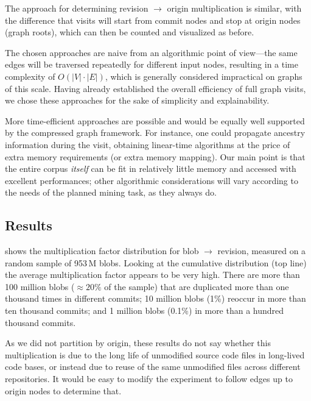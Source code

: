 The approach for determining revision $\to$ origin multiplication is similar,
with the difference that visits will start from commit nodes and stop at origin
nodes (graph roots), which can then be counted and visualized as before.

The chosen approaches are naive from an algorithmic point of view---the same
edges will be traversed repeatedly for different input nodes,
resulting in a time complexity of $O(|V|\cdot |E|)$, which is generally
considered impractical on graphs of this scale.  Having already established the
overall efficiency of full graph visits, we chose these approaches for the sake
of simplicity and explainability.

More time-efficient approaches are possible and would be equally well supported
by the compressed graph framework. For instance, one could propagate ancestry
information during the visit, obtaining linear-time algorithms at the price of
extra memory requirements (or extra memory mapping). Our main point is that the
entire corpus \emph{itself} can be fit in relatively little memory and accessed
with excellent performances; other algorithmic considerations will vary
according to the needs of the planned mining task, as they always do.


\subsection{Results}

 shows the multiplication factor
distribution for blob $\to$ revision, measured on a random sample of 953\,M
blobs. Looking at the cumulative distribution (top line) the average
multiplication factor appears to be very high. There are more than 100 million
blobs ($\approx 20\%$ of the sample) that are duplicated more than one
thousand times in different commits; 10 million blobs (1\%) reoccur in more
than ten thousand commits; and 1 million blobs (0.1\%) in more than a
hundred thousand commits.

As we did not partition by origin, these results do not say whether this
multiplication is due to the long life of unmodified source code files in
long-lived code bases, or instead due to reuse of the same unmodified files
across different repositories. It would be easy to modify the experiment to
follow edges up to origin nodes to determine that.

\smallskip

